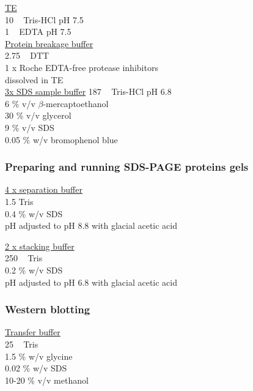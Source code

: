 \underline{TE}\\
10 \si{\milli\Molar} Tris-HCl pH 7.5\\
1 \si{\milli\Molar} EDTA pH 7.5\\

\underline{Protein breakage buffer}\\
2.75 \si{\milli\Molar} DTT \\
1 x Roche EDTA-free protease inhibitors \\
dissolved in TE\\

\underline{3x SDS sample buffer}
187 \si{\milli\Molar} Tris-HCl pH 6.8\\
6 \% v/v $\beta$-mercaptoethanol\\
30 \% v/v glycerol\\
9 \% v/v SDS\\
0.05 \% w/v bromophenol blue\\


\subsubsection{Preparing and running SDS-PAGE proteins gels}

\underline{4 x separation buffer}\\
1.5 \si{\Molar} Tris\\
0.4 \% w/v SDS\\
pH adjusted to pH 8.8 with glacial acetic acid

\underline{2 x stacking buffer}\\
250 \si{\milli\Molar} Tris\\
0.2 \% w/v SDS\\
pH adjusted to pH 6.8 with glacial acetic acid\\


\subsubsection{Western blotting}

\underline{Transfer buffer} \\
25 \si{\milli\Molar} Tris \\
1.5 \% w/v glycine\\
0.02 \% w/v SDS\\
10-20 \% v/v methanol\\

